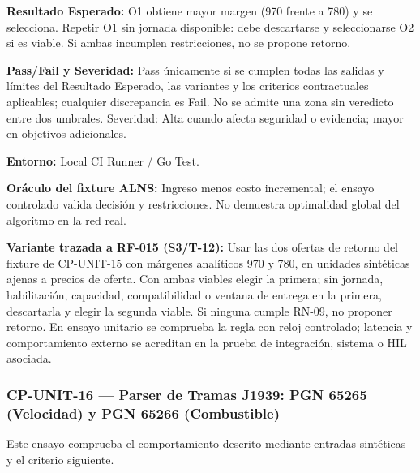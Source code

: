 \par\noindent\textbf{Resultado Esperado:} O1 obtiene mayor margen (970 frente a 780) y se selecciona. Repetir O1 sin jornada disponible: debe descartarse y seleccionarse O2 si es viable. Si ambas incumplen restricciones, no se propone retorno.\par
\par\noindent\textbf{Pass/Fail y Severidad:} Pass únicamente si se cumplen todas las salidas y límites del Resultado Esperado, las variantes y los criterios contractuales aplicables; cualquier discrepancia es Fail. No se admite una zona sin veredicto entre dos umbrales. Severidad: Alta cuando afecta seguridad o evidencia; mayor en objetivos adicionales.\par
\par\noindent\textbf{Entorno:} Local CI Runner / Go Test.\par






\par\noindent\textbf{Oráculo del fixture ALNS:} Ingreso menos costo incremental; el ensayo controlado valida decisión y restricciones. No demuestra optimalidad global del algoritmo en la red real.\par\par


\par\noindent\textbf{Variante trazada a RF-015 (S3/T-12):} Usar las dos ofertas de retorno del fixture de CP-UNIT-15 con márgenes analíticos 970 y 780, en unidades sintéticas ajenas a precios de oferta. Con ambas viables elegir la primera; sin jornada, habilitación, capacidad, compatibilidad o ventana de entrega en la primera, descartarla y elegir la segunda viable. Si ninguna cumple RN-09, no proponer retorno. En ensayo unitario se comprueba la regla con reloj controlado; latencia y comportamiento externo se acreditan en la prueba de integración, sistema o HIL asociada.\par
\subsubsection*{CP-UNIT-16 — Parser de Tramas J1939: PGN 65265 (Velocidad) y PGN 65266 (Combustible)}\label{sec:9-cp-unit-16}

Este ensayo comprueba el comportamiento descrito mediante entradas sintéticas y el criterio siguiente.

